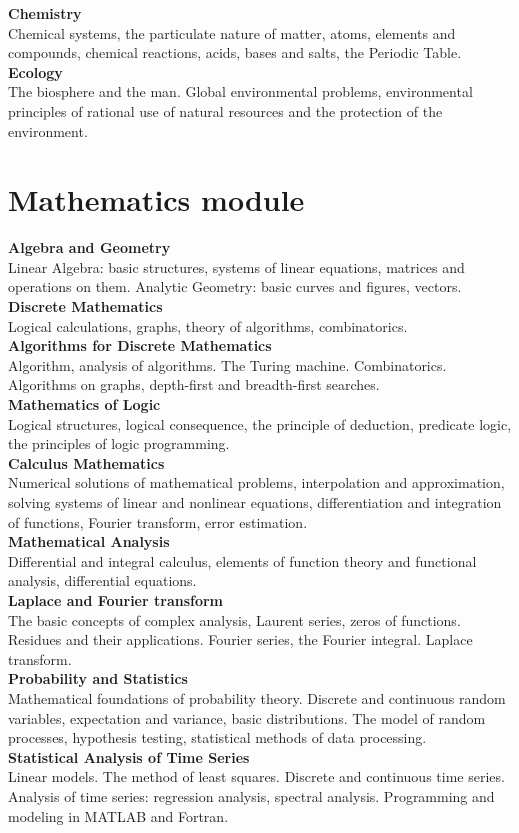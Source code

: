 \documentclass[a4paper, 12pt]{article}
\newcommand{\group}[1] {\section{#1}}
\newcommand{\discipline}[1] {\textbf{#1} \\ }
\newcommand{\desc}[1] { #1 \\ }
\begin{document}
\discipline{Chemistry}
\desc{Chemical systems, the particulate nature of matter, atoms, elements and compounds, chemical reactions, acids, bases and salts, the Periodic Table.}

\discipline{Ecology}
\desc{The biosphere and the man. Global environmental problems, environmental principles of rational use of natural resources and the protection of the environment.}


\group{Mathematics module}

\discipline{Algebra and Geometry}
\desc{Linear Algebra: basic structures, systems of linear equations, matrices and operations on them. Analytic Geometry: basic curves and figures, vectors.}

\discipline{Discrete Mathematics}
\desc{Logical calculations, graphs, theory of algorithms, combinatorics.}

\discipline{Algorithms for Discrete Mathematics}
\desc{Algorithm, analysis of algorithms. The Turing machine. Combinatorics. Algorithms on graphs, depth-first and breadth-first searches.}

\discipline{Mathematics of Logic}
\desc{Logical structures, logical consequence, the principle of deduction, predicate logic, the principles of logic programming.}

\discipline{Calculus Mathematics}
\desc{Numerical solutions of mathematical problems, interpolation and approximation, solving systems of linear and nonlinear equations, differentiation and integration of functions, Fourier transform, error estimation.}

\discipline{Mathematical Analysis}
\desc{Differential and integral calculus, elements of function theory and functional analysis, differential equations.}

\discipline{Laplace and Fourier transform}
\desc{The basic concepts of complex analysis, Laurent series, zeros of functions. Residues and their applications. Fourier series, the Fourier integral. Laplace transform.}

\discipline{Probability and Statistics}
\desc{Mathematical foundations of probability theory. Discrete and continuous random variables, expectation and variance, basic distributions. The model of random processes, hypothesis testing, statistical methods of data processing.}

\discipline{Statistical Analysis of Time Series}
\desc{Linear models. The method of least squares. Discrete and continuous time series. Analysis of time series: regression analysis, spectral analysis. Programming and modeling in MATLAB and Fortran.}
\end{document}

